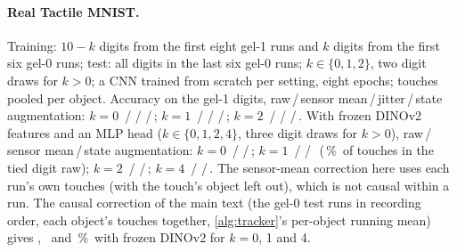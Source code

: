 \documentclass[10pt,twocolumn,letterpaper]{article}
\newcommand{\pct}{\,\%}
\begin{document}
\paragraph{Real Tactile MNIST.} Training: $10-k$ digits from the first eight gel-1 runs and $k$ digits from the first six gel-0 runs; test: all digits in the last six gel-0 runs; $k\in\{0,1,2\}$, two digit draws for $k>0$; a CNN trained from scratch per setting, eight epochs; touches pooled per object. Accuracy on the gel-1 digits, raw\,/\,sensor mean\,/\,jitter\,/\,state augmentation: $k=0$ \CfTmRawZeroCross\,/\,\CfTmStreamZeroCross\,/\,\CfTmJitterZeroCross\,/\,\CfTmSaugZeroCross; $k=1$ \CfTmRawOneCross\,/\,\CfTmStreamOneCross\,/\,\CfTmJitterOneCross\,/\,\CfTmSaugOneCross; $k=2$ \CfTmRawTwoCross\,/\,\CfTmStreamTwoCross\,/\,\CfTmJitterTwoCross\,/\,\CfTmSaugTwoCross. With frozen DINOv2 features and an MLP head ($k\in\{0,1,2,4\}$, three digit draws for $k>0$), raw\,/\,sensor mean\,/\,state augmentation: $k=0$ \CfTmdRawZeroCross\,/\,\CfTmdStreamZeroCross\,/\,\CfTmdSaugZeroCross; $k=1$ \CfTmdRawOneCross\,/\,\CfTmdStreamOneCross\,/\,\CfTmdSaugOneCross\ (\CfTmdRawOneTop\pct\ of touches in the tied digit raw); $k=2$ \CfTmdRawTwoCross\,/\,\CfTmdStreamTwoCross\,/\,\CfTmdSaugTwoCross; $k=4$ \CfTmdRawFourCross\,/\,\CfTmdStreamFourCross\,/\,\CfTmdSaugFourCross. The sensor-mean correction here uses each run's own touches (with the touch's object left out), which is not causal within a run. The causal correction of the main text (the gel-0 test runs in recording order, each object's touches together, \cref{alg:tracker}'s per-object running mean) gives \CfTrkTmZeroCross, \CfTrkTmOneCross\ and \CfTrkTmFourCross\pct\ with frozen DINOv2 for $k=0$, 1 and 4.
\end{document}
